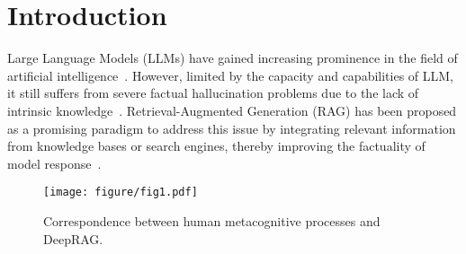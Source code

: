
\section{Introduction}

Large Language Models (LLMs) have gained increasing prominence in the field of artificial intelligence~\cite{zhao2023survey}.
However, limited by the capacity and capabilities of LLM, it still suffers from severe factual hallucination problems due to the lack of intrinsic knowledge~\cite{zhang2023hallucination,huang2023survey}.
Retrieval-Augmented Generation (RAG) has been proposed as a promising paradigm to address this issue by integrating relevant information from knowledge bases or search engines, thereby improving the factuality of model response~\cite{zhao2024retrieval}.





\begin{figure}[t]
    \centering
    \texttt{[image: figure/fig1.pdf]}
\caption{Correspondence between human metacognitive processes and DeepRAG.}
    \label{fig:comparison}
\end{figure}

